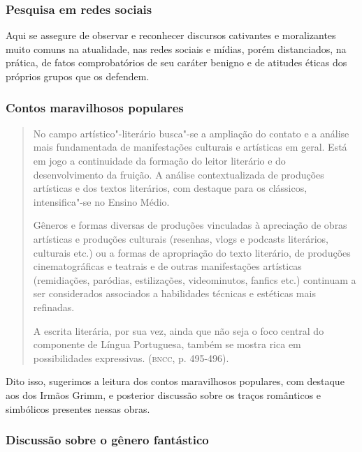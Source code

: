 \documentclass[12pt]{extarticle}
\begin{document}
\subsubsection{Pesquisa em redes sociais}


Aqui se assegure de observar e reconhecer discursos cativantes e
moralizantes muito comuns na atualidade, nas redes sociais e mídias,
porém distanciados, na prática, de fatos comprobatórios de seu caráter
benigno e de atitudes éticas dos próprios grupos que os defendem.

\subsubsection{Contos maravilhosos populares}

\begin{quote}
No campo artístico"-literário busca"-se a ampliação do contato e a
análise mais fundamentada de manifestações culturais e artísticas em
geral. Está em jogo a continuidade da formação do leitor literário e do
desenvolvimento da fruição. A análise contextualizada de produções
artísticas e dos textos literários, com destaque para os clássicos,
intensifica"-se no Ensino Médio. 

Gêneros e formas diversas de produções
vinculadas à apreciação de obras artísticas e produções culturais
(resenhas, vlogs e podcasts literários, culturais etc.) ou a formas de
apropriação do texto literário, de produções cinematográficas e teatrais
e de outras manifestações artísticas (remidiações, paródias,
estilizações, videominutos, fanfics etc.) continuam a ser considerados
associados a habilidades técnicas e estéticas mais refinadas.

A escrita literária, por sua vez, ainda que não seja o foco central do
componente de Língua Portuguesa, também se mostra rica em possibilidades
expressivas. (\textsc{bncc}, p. 495-496).
\end{quote}

Dito isso, sugerimos a leitura dos contos maravilhosos populares, com
destaque aos dos Irmãos Grimm, e posterior discussão sobre os traços
românticos e simbólicos presentes nessas obras.


\subsubsection{Discussão sobre o gênero fantástico}
\end{document}

